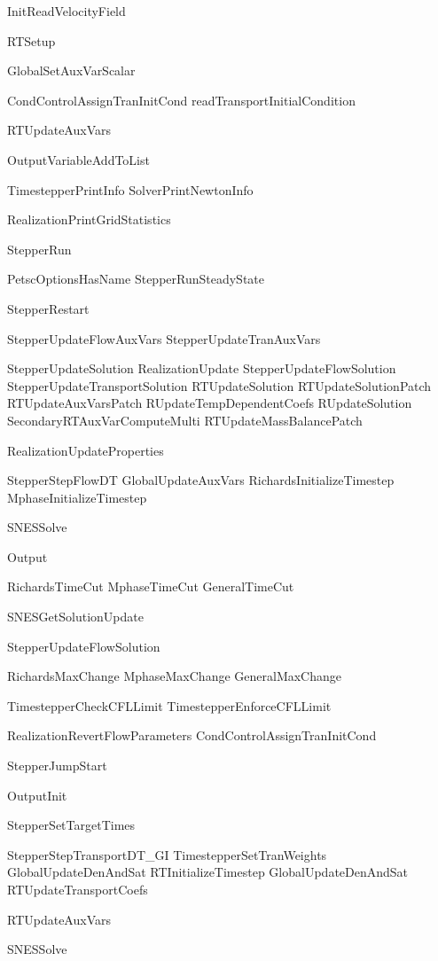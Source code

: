 		InitReadVelocityField
		
		RTSetup
		
		GlobalSetAuxVarScalar
		
		CondControlAssignTranInitCond
		readTransportInitialCondition
		
		RTUpdateAuxVars
		
		OutputVariableAddToList
		
		TimestepperPrintInfo
		SolverPrintNewtonInfo
		
		RealizationPrintGridStatistics

	StepperRun

		PetscOptionsHasName
		StepperRunSteadyState

		StepperRestart
	
		StepperUpdateFlowAuxVars
		StepperUpdateTranAuxVars

		StepperUpdateSolution
			RealizationUpdate
			StepperUpdateFlowSolution
			StepperUpdateTransportSolution
				RTUpdateSolution
					RTUpdateSolutionPatch
						RTUpdateAuxVarsPatch
						RUpdateTempDependentCoefs
						RUpdateSolution
						SecondaryRTAuxVarComputeMulti
						RTUpdateMassBalancePatch

				RealizationUpdateProperties
	
		StepperStepFlowDT
			GlobalUpdateAuxVars
			RichardsInitializeTimestep
			MphaseInitializeTimestep
			
			SNESSolve
			
			Output
			
			RichardsTimeCut
			MphaseTimeCut
			GeneralTimeCut
			
			SNESGetSolutionUpdate
			
			StepperUpdateFlowSolution
			
			RichardsMaxChange
			MphaseMaxChange
			GeneralMaxChange
			
		TimestepperCheckCFLLimit
		TimestepperEnforceCFLLimit
	
		RealizationRevertFlowParameters
		CondControlAssignTranInitCond
	
		StepperJumpStart
	
		OutputInit
	
		StepperSetTargetTimes
	
		StepperStepTransportDT_GI
			TimestepperSetTranWeights
			GlobalUpdateDenAndSat
			RTInitializeTimestep
			GlobalUpdateDenAndSat
			RTUpdateTransportCoefs
			
			RTUpdateAuxVars
			
			SNESSolve
			
